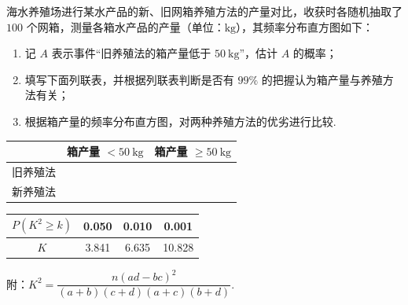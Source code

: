 \begin{problem}
海水养殖场进行某水产品的新、旧网箱养殖方法的产量对比，收获时各随机抽取了 \(100\) 个网箱，测量各箱水产品的产量（单位：\(\mathrm{kg}\)），其频率分布直方图如下：
\begin{enumerate}
\item 记 \(A\) 表示事件“旧养殖法的箱产量低于 \(50 \mathrm{~kg}\)”，估计 \(A\) 的概率；
\item 填写下面列联表，并根据列联表判断是否有 \(99\%\) 的把握认为箱产量与养殖方法有关；
\item 根据箱产量的频率分布直方图，对两种养殖方法的优劣进行比较.
\end{enumerate}

\begin{center}
\begin{tabular}{|c|c|c|}
\hline
& 箱产量 \(<50\mathrm{~kg}\) & 箱产量 \(\ge 50\mathrm{~kg}\)\\
\hline
旧养殖法 &  &  \\
\hline
新养殖法 &  &  \\
\hline
\end{tabular}
\end{center}

\begin{center}
\begin{tabular}{|c|c|c|c|}
\hline
\(P(K^2\ge k)\) & 0.050 & 0.010 & 0.001\\
\hline
\(K\) & 3.841 & 6.635 & 10.828\\
\hline
\end{tabular}
\end{center}

附：\(K^2=\dfrac{n(ad-bc)^2}{(a+b)(c+d)(a+c)(b+d)}\).

\begin{center}
\end{center}
\end{problem}


